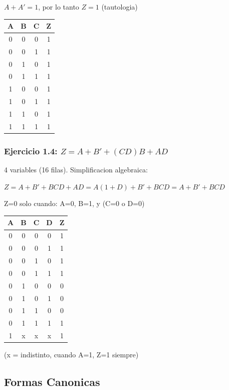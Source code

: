 \documentclass[12pt,a4paper]{article}
\begin{document}
$A + A' = 1$, por lo tanto $Z = 1$ (tautologia)

\begin{center}
\begin{tabular}{|c|c|c|c|}
\hline
A & B & C & Z \\
\hline
0 & 0 & 0 & 1 \\
0 & 0 & 1 & 1 \\
0 & 1 & 0 & 1 \\
0 & 1 & 1 & 1 \\
1 & 0 & 0 & 1 \\
1 & 0 & 1 & 1 \\
1 & 1 & 0 & 1 \\
1 & 1 & 1 & 1 \\
\hline
\end{tabular}
\end{center}

\subsubsection{Ejercicio 1.4: $Z = A + B' + (CD)B + AD$}

4 variables (16 filas). Simplificacion algebraica:

$Z = A + B' + BCD + AD = A(1+D) + B' + BCD = A + B' + BCD$

Z=0 solo cuando: A=0, B=1, y (C=0 o D=0)

\begin{center}
\begin{tabular}{|c|c|c|c|c|}
\hline
A & B & C & D & Z \\
\hline
0 & 0 & 0 & 0 & 1 \\
0 & 0 & 0 & 1 & 1 \\
0 & 0 & 1 & 0 & 1 \\
0 & 0 & 1 & 1 & 1 \\
0 & 1 & 0 & 0 & 0 \\
0 & 1 & 0 & 1 & 0 \\
0 & 1 & 1 & 0 & 0 \\
0 & 1 & 1 & 1 & 1 \\
1 & x & x & x & 1 \\
\hline
\end{tabular}
\end{center}

(x = indistinto, cuando A=1, Z=1 siempre)

\subsection{Formas Canonicas}
\end{document}
